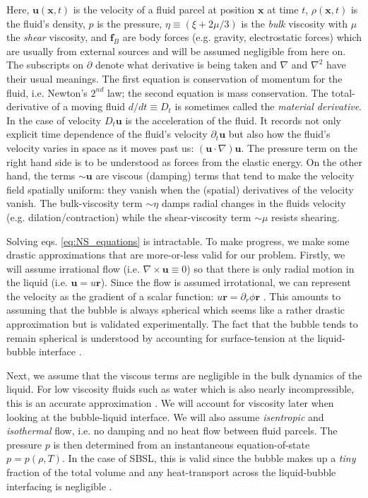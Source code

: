 \documentclass[prb,aps,nofootinbib,superscriptaddress,floatfix]{revtex4-2}
\begin{document}
Here, $\bm{u}(\bm{x},t)$ is the velocity of a fluid parcel at position $\bm{x}$ at time $t$, $\rho (\bm{x},t)$ is the fluid's density, $p$ is the pressure, $\eta \equiv \left(\xi + 2\mu/3 \right)$ is the \emph{bulk} viscosity with $\mu$ the \emph{shear} viscosity, and $\bm{f}_B$ are body forces (e.g. gravity, electrostatic forces) which are usually from external sources and will be assumed negligible from here on. The subscripts on $\partial$ denote what derivative is being taken and $\nabla$ and $\nabla^2$ have their usual meanings. The first equation is conservation of momentum for the fluid, i.e. Newton's $2^{nd}$ law; the second equation is mass conservation. The total-derivative of a moving fluid $d/dt\equiv D_t$ is sometimes called the \emph{material derivative}. In the case of velocity $D_t \bm{u}$ is the acceleration of the fluid. It records not only explicit time dependence of the fluid's velocity $\partial_t \bm{u}$ but also how the fluid's velocity varies in space as it moves past us: $\left( \bm{u}\cdot\nabla \right) \bm{u}$. The pressure term on the right hand side is to be understood as forces from the elastic energy. On the other hand, the terms $\sim \bm{u}$ are viscous (damping) terms that tend to make the velocity field spatially uniform: they vanish when the (spatial) derivatives of the velocity vanish. The bulk-viscosity term $\sim \eta$ damps radial changes in the fluids velocity (e.g. dilation/contraction) while the shear-viscosity term $\sim\mu$ resists shearing. 

Solving eqs. \ref{eq:NS_equations} is intractable. To make progress, we make some drastic approximations that are more-or-less valid for our problem. Firstly, we will assume irrational flow (i.e. $\nabla\times\bm{u}\equiv 0$) so that there is only radial motion in the liquid (i.e. $\bm{u}=u\bm{r}$). Since the flow is assumed irrotational, we can represent the velocity as the gradient of a scalar function: $u\bm{r}=\partial_r \phi \bm{r}$ \cite{jackson1999classical}. This amounts to assuming that the bubble is always spherical which seems like a rather drastic approximation but is validated experimentally. The fact that the bubble tends to remain spherical is understood by accounting for surface-tension at the liquid-bubble interface \cite{prosperetti1999old}. 

Next, we assume that the viscous terms are negligible in the bulk dynamics of the liquid. For low viscosity fluids such as water which is also nearly incompressible, this is an accurate approximation \cite{prosperetti1986bubble,prosperetti1999old,brenner2002single,plesset1977bubble}. We will account for viscosity later when looking at the bubble-liquid interface. We will also assume \emph{isentropic} and \emph{isothermal} flow, i.e. no damping and no heat flow between fluid parcels. The pressure $p$ is then determined from an instantaneous equation-of-state $p=p(\rho,T)$. In the case of SBSL, this is valid since the bubble makes up a \emph{tiny} fraction of the total volume and any heat-transport across the liquid-bubble interfacing is negligible \cite{prosperetti1999old}.
\end{document}
